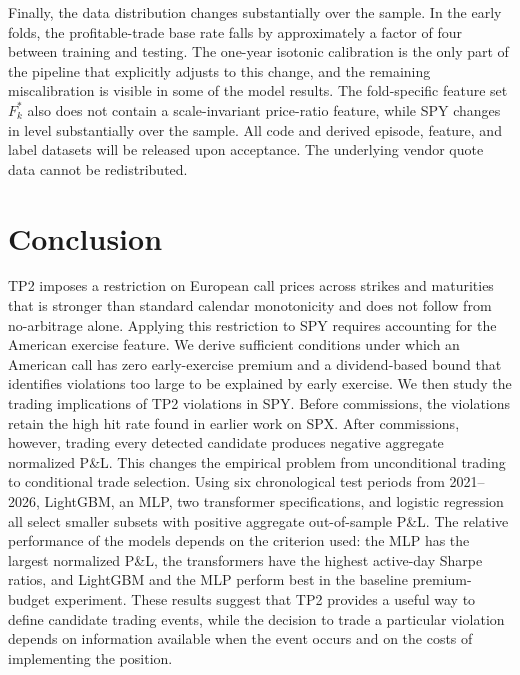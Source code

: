 \documentclass[sigconf,review,anonymous]{acmart}
\begin{document}
Finally, the data distribution changes substantially over the sample. In the early folds, the profitable-trade base rate falls by approximately a factor of four between training and testing. The one-year isotonic calibration is the only part of the pipeline that explicitly adjusts to this change, and the remaining miscalibration is visible in some of the model results. The fold-specific feature set $F_k^\ast$ also does not contain a scale-invariant price-ratio feature, while SPY changes in level substantially over the sample.
All code and derived episode, feature, and label datasets will be released upon acceptance. The underlying vendor quote data cannot be redistributed.

\section{Conclusion}
TP2 imposes a restriction on European call prices across strikes and maturities that is stronger than standard calendar monotonicity and does not follow from no-arbitrage alone. Applying this restriction to SPY requires accounting for the American exercise feature. We derive sufficient conditions under which an American call has zero early-exercise premium and a dividend-based bound that identifies violations too large to be explained by early exercise.
We then study the trading implications of TP2 violations in SPY. Before commissions, the violations retain the high hit rate found in earlier work on SPX. After commissions, however, trading every detected candidate produces negative aggregate normalized P\&L. This changes the empirical problem from unconditional trading to conditional trade selection.
Using six chronological test periods from 2021--2026, LightGBM, an MLP, two transformer specifications, and logistic regression all select smaller subsets with positive aggregate out-of-sample P\&L. The relative performance of the models depends on the criterion used: the MLP has the largest normalized P\&L, the transformers have the highest active-day Sharpe ratios, and LightGBM and the MLP perform best in the baseline premium-budget experiment. These results suggest that TP2 provides a useful way to define candidate trading events, while the decision to trade a particular violation depends on information available when the event occurs and on the costs of implementing the position.
\end{document}
